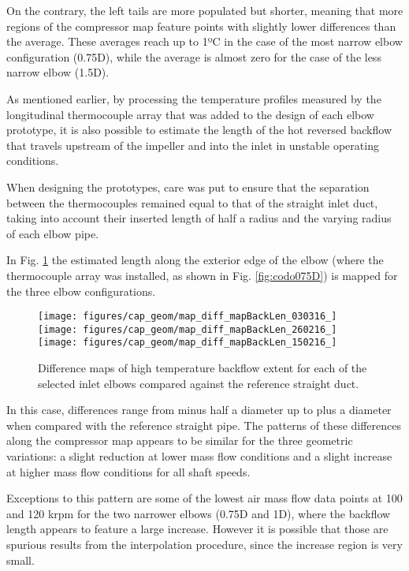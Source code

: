On the contrary, the left tails are more populated but shorter, meaning that more regions of the compressor map feature points with slightly lower differences than the average. These averages reach up to 1ºC in the case of the most narrow elbow configuration (0.75D), while the average is almost zero for the case of the less narrow elbow (1.5D).

As mentioned earlier, by processing the temperature profiles measured by the longitudinal thermocouple array that was added to the design of each elbow prototype, it is also possible to estimate the length of the hot reversed backflow that travels upstream of the impeller and into the inlet in unstable operating conditions.

When designing the prototypes, care was put to ensure that the separation between the thermocouples remained equal to that of the straight inlet duct, taking into account their inserted length of half a radius and the varying radius of each elbow pipe.

In Fig. \ref{fig:map_diff_backL} the estimated length along the exterior edge of the elbow (where the thermocouple array was installed, as shown in Fig. \ref{fig:codo075D}) is mapped for the three elbow configurations.

\begin{figure}[htb!]
\centering
\texttt{[image: figures/cap\_geom/map\_diff\_mapBackLen\_030316\_]}\hspace{4mm}
\texttt{[image: figures/cap\_geom/map\_diff\_mapBackLen\_260216\_]}\\[3mm]
\texttt{[image: figures/cap\_geom/map\_diff\_mapBackLen\_150216\_]}\hspace{4mm}
\caption{Difference maps of high temperature backflow extent for each of the selected inlet elbows compared against the reference straight duct.}
\label{fig:map_diff_backL}
\end{figure}

In this case, differences range from minus half a diameter up to plus a diameter when compared with the reference straight pipe. The patterns of these differences along the compressor map appears to be similar for the three geometric variations: a slight reduction at lower mass flow conditions and a slight increase at higher mass flow conditions for all shaft speeds.

Exceptions to this pattern are some of the lowest air mass flow data points at 100 and 120 krpm for the two narrower elbows (0.75D and 1D), where the backflow length appears to feature a large increase. However it is possible that those are spurious results from the interpolation procedure, since the increase region is very small.

